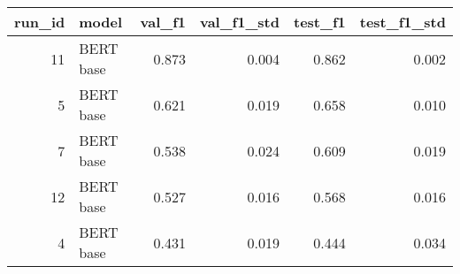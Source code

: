 \begin{tabular}{rlrrrr}
\toprule
 run\_id &     model &  val\_f1 &  val\_f1\_std &  test\_f1 &  test\_f1\_std \\
\midrule
     11 & BERT base &   0.873 &       0.004 &    0.862 &        0.002 \\
      5 & BERT base &   0.621 &       0.019 &    0.658 &        0.010 \\
      7 & BERT base &   0.538 &       0.024 &    0.609 &        0.019 \\
     12 & BERT base &   0.527 &       0.016 &    0.568 &        0.016 \\
      4 & BERT base &   0.431 &       0.019 &    0.444 &        0.034 \\
\bottomrule
\end{tabular}
